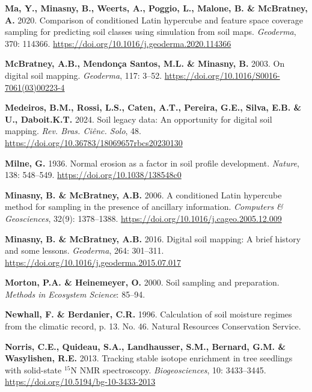 \documentclass[
  10pt,
  b5paper,
  oneside]{book}
\newlength{\cslhangindent}
\newenvironment{CSLReferences}[2] %
 {\begin{list}{}{%
  \setlength{\itemindent}{0pt}
  \setlength{\leftmargin}{0pt}
  \setlength{\parsep}{0pt}
  \ifodd #1
   \setlength{\leftmargin}{\cslhangindent}
   \setlength{\itemindent}{-1\cslhangindent}
  \fi
  \setlength{\itemsep}{#2\baselineskip}}}
 {\end{list}}
\begin{document}
\begin{CSLReferences}{0}{0}
\textbf{Ma, Y., Minasny, B., Weerts, A., Poggio, L., Malone, B. \& McBratney, A.} 2020. Comparison of conditioned {Latin} hypercube and feature space coverage sampling for predicting soil classes using simulation from soil maps. \emph{Geoderma}, 370: 114366. \url{https://doi.org/10.1016/j.geoderma.2020.114366}

\textbf{McBratney, A.B., Mendonça Santos, M.L. \& Minasny, B.} 2003. On digital soil mapping. \emph{Geoderma}, 117: 3--52. \url{https://doi.org/10.1016/S0016-7061(03)00223-4}

\textbf{Medeiros, B.M., Rossi, L.S., Caten, A.T., Pereira, G.E., Silva, E.B. \& U., Daboit.K.T.} 2024. Soil legacy data: An opportunity for digital soil mapping. \emph{Rev. Bras. Ciênc. Solo}, 48. \url{https://doi.org/10.36783/18069657rbcs20230130}

\textbf{Milne, G.} 1936. Normal erosion as a factor in soil profile development. \emph{Nature}, 138: 548--549. \url{https://doi.org/10.1038/138548c0}

\textbf{Minasny, B. \& McBratney, A.B.} 2006. A conditioned {Latin} hypercube method for sampling in the presence of ancillary information. \emph{Computers \& Geosciences}, 32(9): 1378--1388. \url{https://doi.org/10.1016/j.cageo.2005.12.009}

\textbf{Minasny, B. \& McBratney, A.B.} 2016. Digital soil mapping: A brief history and some lessons. \emph{Geoderma}, 264: 301--311. \url{https://doi.org/10.1016/j.geoderma.2015.07.017}

\textbf{Morton, P.A. \& Heinemeyer, O.} 2000. Soil sampling and preparation. \emph{Methods in Ecosystem Science}: 85--94.

\textbf{Newhall, F. \& Berdanier, C.R.} 1996. Calculation of soil moisture regimes from the climatic record, p. 13. No. 46. Natural Resources Conservation Service.

\textbf{Norris, C.E., Quideau, S.A., Landhausser, S.M., Bernard, G.M. \& Wasylishen, R.E.} 2013. Tracking stable isotope enrichment in tree seedlings with solid-state {\(^{15}\)N} {NMR} spectroscopy. \emph{Biogeosciences}, 10: 3433--3445. \url{https://doi.org/10.5194/bg-10-3433-2013}


\end{CSLReferences}
\end{document}
